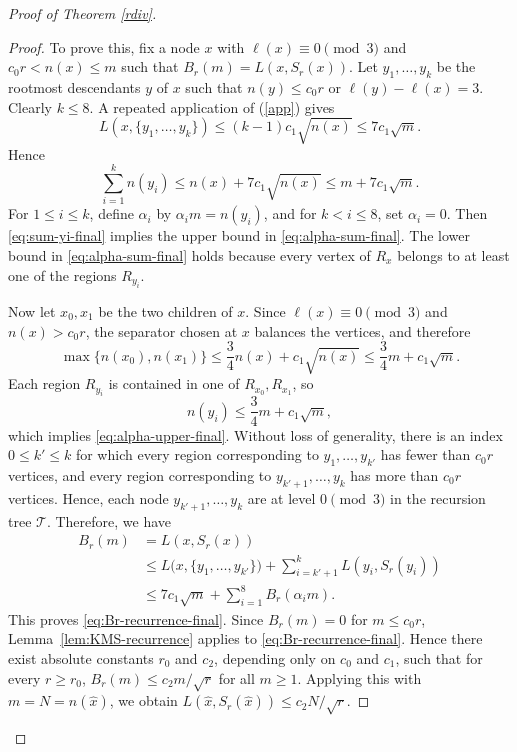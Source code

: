 \documentclass[11pt]{article}
\theoremstyle{plain}
\theoremstyle{definition}
\theoremstyle{remark}
\begin{document}
\begin{proof}[Proof of Theorem \ref{rdiv}]
\begin{proof}
To prove this, fix a node \(x\) with \(\ell(x)\equiv 0\pmod 3\) and \(c_0r<n(x)\le m\) such that $B_r(m) = L(x,S_r(x))$.  
Let \(y_1,\dots,y_k\) be the rootmost descendants \(y\) of \(x\) such that $n(y)\le c_0r$ or $\ell(y)-\ell(x)=3.$  Clearly \(k\le 8\).
A repeated application of (\ref{app}) gives
\[
L(x,\{y_1,\dots,y_k\})\le (k-1)c_1\sqrt{n(x)}\le 7c_1\sqrt m.
\]
Hence
\begin{equation}\label{eq:sum-yi-final}
\sum_{i=1}^k n(y_i)\le n(x)+7c_1\sqrt{n(x)}\le m+7c_1\sqrt m.
\end{equation}
For \(1\le i\le k\), define \(\alpha_i\) by \(\alpha_i m=n(y_i)\), and for \(k<i\le 8\), set \(\alpha_i=0\).
Then \eqref{eq:sum-yi-final} implies the upper bound in \eqref{eq:alpha-sum-final}.
The lower bound in \eqref{eq:alpha-sum-final} holds because every vertex of \(R_x\) belongs to at least one
of the regions \(R_{y_i}\).

Now let \(x_0,x_1\) be the two children of \(x\). Since \(\ell(x)\equiv 0\pmod 3\) and \(n(x)>c_0r\), the
separator chosen at \(x\) balances the vertices, and therefore
\[
\max\{n(x_0),n(x_1)\}\le \frac34 n(x)+c_1\sqrt{n(x)}\le \frac34 m+c_1\sqrt m.
\]
Each region \(R_{y_i}\) is contained in one of \(R_{x_0},R_{x_1}\), so
\[
n(y_i)\le \frac34 m+c_1\sqrt m,
\]
which implies \eqref{eq:alpha-upper-final}. Without loss of generality, there is an index \(0\le k'\le k\) for which every region corresponding to \(y_1,\ldots,y_{k'}\) has fewer than \(c_0r\) vertices, and every region corresponding to \(y_{k'+1},\ldots,y_k\) has more than \(c_0r\) vertices.  Hence, each node $y_{k'+1},\ldots , y_k$ are at level $0  \pmod 3 $ in the recursion tree $\mathcal{T}$. Therefore, we have
\begin{align*}
B_r(m)
&= L(x,S_r(x)) \\
&\le
L\bigl(x,\{y_1,\ldots,y_{k'}\}\bigr)
+\sum_{i=k'+1}^{k} L(y_i,S_r(y_i)) \\
&\le
7c_1\sqrt m+\sum_{i=1}^{8} B_r(\alpha_i m).
\end{align*}
This proves \eqref{eq:Br-recurrence-final}.  Since \(B_r(m)=0\) for \(m\le c_0r\), Lemma~\ref{lem:KMS-recurrence} applies to
\eqref{eq:Br-recurrence-final}. Hence there exist absolute constants \(r_0\) and \(c_2\), depending only on
\(c_0\) and \(c_1\), such that for every \(r\ge r_0\), $B_r(m)\le c_2 m/\sqrt r $ for all $m \geq 1$. Applying this with \(m=N=n(\hat x)\), we obtain $L(\hat x,S_r(\hat x))\le c_2N/\sqrt{r}.$
\end{proof}

















\end{proof}
\end{document}
